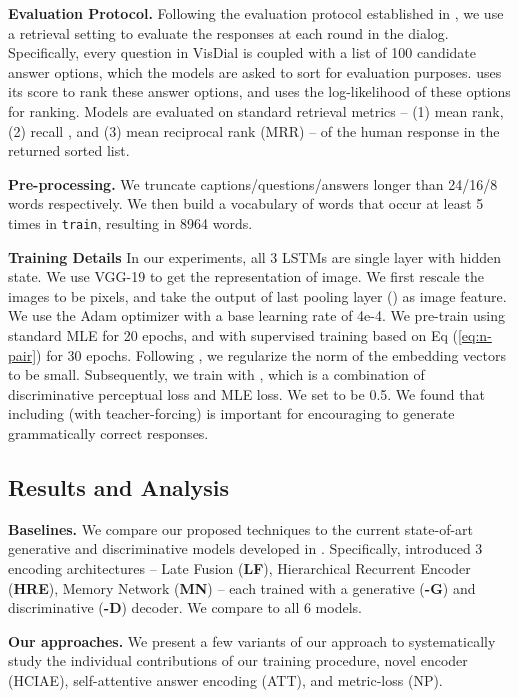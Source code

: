 \documentclass{article}
\newcommand{\vd}{VisDial\xspace}
\newcommand{\ourenc}{HCIAE\xspace}
\newcommand{\train}{\texttt{train}\xspace}
\begin{document}
\textbf{Evaluation Protocol.} Following the evaluation protocol established in \cite{visdial}, 
we use a retrieval setting to evaluate the responses at each round in the dialog. 
Specifically, every question in \vd is coupled with a list of 100 candidate answer options, which the models are asked to sort for evaluation purposes. 
 uses its score to rank these answer options, and  uses the log-likelihood of these options for ranking. 
Models are evaluated on standard retrieval metrics -- (1) mean rank, 
(2) recall , and (3) mean reciprocal rank (MRR) -- of the human response in the returned sorted list.  

\textbf{Pre-processing.} We truncate captions/questions/answers longer than 24/16/8 words respectively. 
We then build a vocabulary of words that occur at least 5 times in \train, resulting in 8964 words. 

\textbf{Training Details}
In our experiments, all 3 LSTMs are single layer with  hidden state. 
We use VGG-19 \cite{simonyan2014very} to get the representation of image. We first rescale the images to be  pixels, and take the output of last pooling layer () as image feature.
We use the Adam optimizer with a base learning rate of 4e-4. We pre-train  using standard MLE 
for 20 epochs, and  with supervised training based on Eq (\ref{eq:n-pair}) for 30 epochs. Following \cite{sohn2016improved}, we regularize the  norm of the embedding vectors to be small. Subsequently, we train  with , which is a combination of discriminative perceptual loss and MLE loss. We set  to be 0.5. 
We found that including  (with teacher-forcing) is important for encouraging  to generate grammatically correct responses. 

\subsection{Results and Analysis}
\label{exp:result}


\textbf{Baselines.}
We compare our proposed techniques to the current state-of-art generative and discriminative models developed in \cite{visdial}. 
Specifically, \cite{visdial} introduced 3 encoding architectures --  
Late Fusion (\textbf{LF}), Hierarchical Recurrent Encoder (\textbf{HRE}), Memory Network (\textbf{MN}) -- 
each trained with a generative (\textbf{-G}) and discriminative (\textbf{-D}) decoder. We compare to all 6 models. 

\textbf{Our approaches.}
We present a few variants of our approach to systematically study the individual contributions of our training procedure, novel encoder (\ourenc), self-attentive answer encoding (ATT), and metric-loss (NP). 
\end{document}
